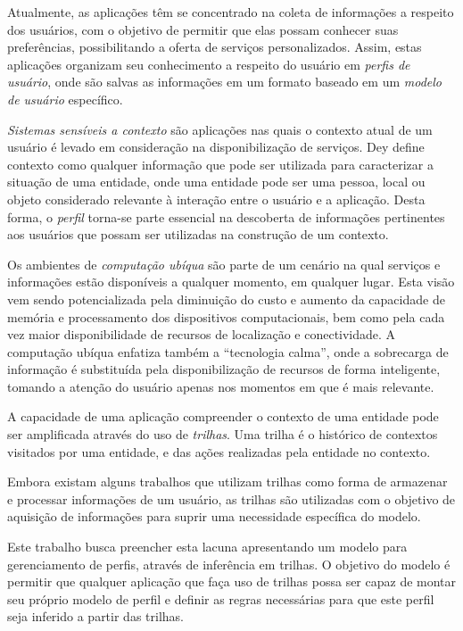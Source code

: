 Atualmente, as aplicações têm se concentrado na coleta de informações a respeito dos usuários, com o objetivo de permitir que elas possam conhecer suas preferências, possibilitando a oferta de serviços personalizados. Assim, estas aplicações organizam seu conhecimento a respeito do usuário em \emph{perfis de usuário}, onde são salvas as informações em um formato baseado em um \emph{modelo de usuário} específico.\cite{viviani10}

\emph{Sistemas sensíveis a contexto} são aplicações nas quais o contexto atual de um usuário é levado em consideração na disponibilização de serviços. Dey\cite{dey2001} define contexto como qualquer informação que pode ser utilizada para caracterizar a situação de uma entidade, onde uma entidade pode ser uma pessoa, local ou objeto considerado relevante à interação entre o usuário e a aplicação. Desta forma, o \emph{perfil} torna-se parte essencial na descoberta de informações pertinentes aos usuários que possam ser utilizadas na construção de um contexto.

Os ambientes de \emph{computação ubíqua} são parte de um cenário na qual serviços e informações estão disponíveis a qualquer momento, em qualquer lugar\cite{weiser91}. Esta visão vem sendo potencializada pela diminuição do custo e aumento da capacidade de memória e processamento dos dispositivos computacionais, bem como pela cada vez maior disponibilidade de recursos de localização e conectividade. A computação ubíqua enfatiza também a ``tecnologia calma'', onde a sobrecarga de informação é substituída pela disponibilização de recursos de forma inteligente, tomando a atenção do usuário apenas nos momentos em que é mais relevante.\cite{weiser96}

A capacidade de uma aplicação compreender o contexto de uma entidade pode ser amplificada através do uso de \emph{trilhas}\cite{silva09}. Uma trilha é o histórico de contextos visitados por uma entidade, e das ações realizadas pela entidade no contexto.

Embora existam alguns trabalhos que utilizam trilhas como forma de armazenar e processar informações de um usuário\cite{silva08,silva09}, as trilhas são utilizadas com o objetivo de aquisição de informações para suprir uma necessidade específica do modelo.

Este trabalho busca preencher esta lacuna apresentando um modelo para gerenciamento de perfis, através de inferência em trilhas. O objetivo do modelo é permitir que qualquer aplicação que faça uso de trilhas possa ser capaz de montar seu próprio modelo de perfil e definir as regras necessárias para que este perfil seja inferido a partir das trilhas.
